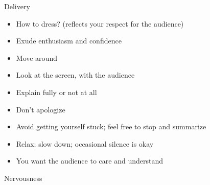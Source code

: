 \documentclass[12pt]{article}
\newcommand{\headsize}{\fontsize{35}{35} \selectfont}
\newcommand{\smallsize}{\fontsize{25}{30} \selectfont}
\newcommand{\smallersize}{\fontsize{20}{25} \selectfont}
\begin{document}
\newpage

\headsize \color{myyellow}
\hfill \begin{minipage}{5.75in}
\centering
Delivery
\end{minipage}

\vspace{15mm} \color{mywhite} \smallsize

\hfill \begin{minipage}{9.5in}

\begin{itemize}
\itemsep18pt
\item How to dress?  {\color{myblue} \smallersize (reflects your
    respect for the audience)}

\item Exude enthusiasm and confidence

\item Move around

\item Look at the screen, {\color{mypink} with} the audience

\item Explain fully or not at all

\item Don't apologize

\item Avoid getting yourself stuck; feel free to stop and summarize

\item Relax; slow down; occasional silence is okay

\item You want the audience to {\color{mypink} care} and
  {\color{mypink} understand}


\end{itemize}

\end{minipage}


\newpage

\headsize \color{myyellow}
\hfill \begin{minipage}{5.75in}
\centering
Nervousness
\end{minipage}

\vspace{3cm} \color{mywhite} \smallsize
\end{document}
